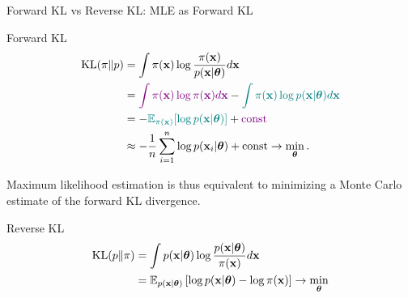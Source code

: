 \documentclass{beamer}
\begin{document}
\begin{frame}{Forward KL vs Reverse KL: MLE as Forward KL}
	\begin{block}{Forward KL}
		\vspace{-0.5cm}
		\begin{align*}
			\mathrm{KL}(\pi \| p) &= \int \pi(\mathbf{x}) \log \frac{\pi(\mathbf{x})}{p(\mathbf{x} | \boldsymbol{\theta})} d\mathbf{x} \\
			&= {\color{violet}\int \pi (\mathbf{x}) \log \pi(\mathbf{x}) d \mathbf{x}} - {\color{teal}\int \pi (\mathbf{x}) \log p(\mathbf{x} | \boldsymbol{\theta}) d \mathbf{x}} \\
			&= -{\color{teal}\mathbb{E}_{\pi(\mathbf{x})} [\log p(\mathbf{x} | \boldsymbol{\theta})]} + {\color{violet}\text{const}} \\
			& \approx - \frac{1}{n} \sum_{i=1}^n \log p(\mathbf{x}_i | \boldsymbol{\theta}) + \text{const} \rightarrow \min_{\boldsymbol{\theta}}.
		\end{align*}
		\vspace{-0.5cm}
	\end{block}
	Maximum likelihood estimation is thus equivalent to minimizing a Monte Carlo estimate of the forward KL divergence.
	\begin{block}{Reverse KL}
		\vspace{-0.5cm}
		\begin{align*}
			\mathrm{KL}(p \| \pi) &= \int p(\mathbf{x} | \boldsymbol{\theta}) \log \frac{p(\mathbf{x} | \boldsymbol{\theta})}{\pi(\mathbf{x})} d \mathbf{x} \\
			&= \mathbb{E}_{p(\mathbf{x} | \boldsymbol{\theta})} \left[\log p(\mathbf{x} | \boldsymbol{\theta}) - \log \pi(\mathbf{x})\right] \rightarrow \min_{\boldsymbol{\theta}}
		\end{align*}
		\vspace{-0.7cm}
	\end{block}
\end{frame}
\end{document}
